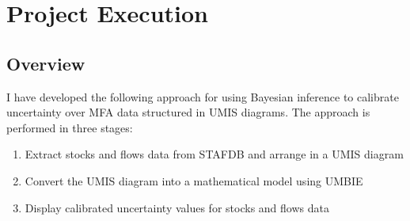 \documentclass[ %
                    author={Tom Jager},
                supervisor={Dr. Daniel Schien},
                    degree={MEng},
                     title={A Bayesian Inference Engine for Calibrating Uncertainty over UMIS Structured MFA Systems},
                  subtitle={},
                      type={research},
                      year={2019} ]{dissertation}
\begin{document}


\chapter{Project Execution}
\label{chap:execution}

\section{Overview}
I have developed the following approach for using Bayesian inference to calibrate uncertainty over MFA data structured in UMIS diagrams. The approach is performed in three stages:

\begin{enumerate}
    \item Extract stocks and flows data from STAFDB and arrange in a UMIS diagram
    \item Convert the UMIS diagram into a mathematical model using UMBIE
    \item Display calibrated uncertainty values for stocks and flows data
\end{enumerate}

\end{document}
